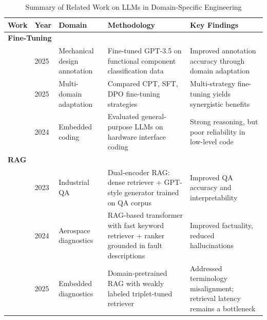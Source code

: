 \documentclass[a4paper,fleqn]{cas-dc}
\renewcommand{\textit}[1]{#1}
\begin{document}
\begin{table}[ht]
\centering
\caption{Summary of Related Work on LLMs in Domain-Specific Engineering}
\label{tab:fine-tuning-rag}
\footnotesize
\begin{tabularx}{\textwidth}{l l l X X}
\toprule
\textbf{Work} & \textbf{Year} & \textbf{Domain} & \textbf{Methodology} & \textbf{Key Findings} \\
\midrule
\multicolumn{4}{l}{\textit{\textbf{Fine-Tuning}}} \\
\hline
\cite{elhambakhsh2025domain} & 2025 & Mechanical design annotation & Fine-tuned GPT-3.5 on functional component classification data & Improved annotation accuracy through domain adaptation \\
\cite{lu2025fine}  & 2025 & Multi-domain adaptation & Compared CPT, SFT, DPO fine-tuning strategies & Multi-strategy fine-tuning yields synergistic benefits \\
\cite{englhardt2024exploring}  & 2024 & Embedded coding & Evaluated general-purpose LLMs on hardware interface coding & Strong reasoning, but poor reliability in low-level code \\
\midrule
\multicolumn{4}{l}{\textit{\textbf{RAG}}} \\
\hline
\cite{ZHANG2023110264}  & 2023 & Industrial QA & Dual-encoder RAG: dense retriever + GPT-style generator trained on QA corpus & Improved QA accuracy and interpretability \\
\cite{hu2024rag}  & 2024 & Aerospace diagnostics & RAG-based transformer with fast keyword retriever + ranker grounded in fault descriptions & Improved factuality, reduced hallucinations \\
\cite{yu2025finemedlm}  & 2025 & Embedded diagnostics & Domain-pretrained RAG with weakly labeled triplet-tuned retriever & Addressed terminology misalignment; retrieval latency remains a bottleneck \\
\bottomrule
\end{tabularx}
\end{table}
\end{document}
